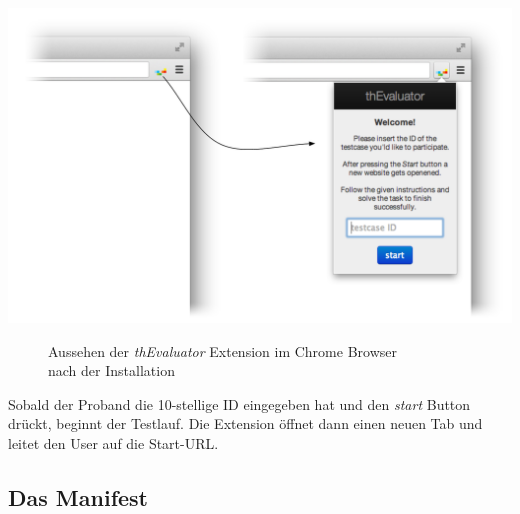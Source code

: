 \begin{center}
\includegraphics[scale=0.55]{./images/extension}
\end{center}
\begin{figure}[htb]
   \centering
   \caption{Aussehen der \textit{thEvaluator} Extension im Chrome Browser\\nach der Installation}
    \label{extension}
\end{figure}

Sobald der Proband die 10-stellige ID eingegeben hat und den \textit{start} Button drückt, beginnt der Testlauf. Die Extension öffnet dann einen neuen Tab und leitet den User auf die Start-URL.

\subsection{Das Manifest}

